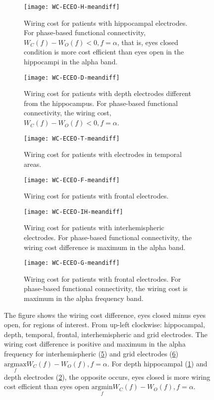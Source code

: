 \documentclass[11pt, onecolumn]{article}
\begin{document}
\begin{figure}[h] 
  \begin{subfigure}[t]{0.5\linewidth}
    \centering
    \texttt{[image: WC-ECEO-H-meandiff]} 
    \caption{Wiring cost for patients with hippocampal electrodes. For phase-based functional connectivity, $W_C(f) - W_O(f) <0, f = \alpha$, that is, eyes closed condition is more cost efficient than eyes open in the hippocampi in the alpha band.} 
    \label{figi-2:a} 
  \end{subfigure}%
  \hspace{1ex}
  \begin{subfigure}[t]{0.5\linewidth}
    \centering
    \texttt{[image: WC-ECEO-D-meandiff]} 
    \caption{Wiring cost for patients with depth electrodes different from the hippocampus. For phase-based functional connectivity, the wiring cost, $W_C(f) - W_O(f) <0, f = \alpha$.} 
    \label{figi-2:b} 
  \end{subfigure} 
  \begin{subfigure}[t]{0.5\linewidth}
    \centering
    \texttt{[image: WC-ECEO-T-meandiff]} 
    \caption{Wiring cost for patients with electrodes in temporal areas.} 
    \label{figi-2:c} 
  \end{subfigure} 
  \hspace{1ex}
 \begin{subfigure}[t]{0.5\linewidth}
    \centering
    \texttt{[image: WC-ECEO-F-meandiff]} 
    \caption{Wiring cost for patients with frontal electrodes. } 
    \label{figi-2:d} 
  \end{subfigure} 
    \begin{subfigure}[t]{0.5\linewidth}
    \centering
    \texttt{[image: WC-ECEO-IH-meandiff]} 
    \caption{Wiring cost for patients with interhemispheric electrodes. For phase-based functional connectivity, the wiring cost difference is maximum in the alpha band.} 
    \label{figi-2:e} 
  \end{subfigure}%
    \hspace{1ex}
   \begin{subfigure}[t]{0.5\linewidth}
    \centering
    \texttt{[image: WC-ECEO-G-meandiff]} 
    \caption{Wiring cost for patients with frontal electrodes. For phase-based functional connectivity, the wiring cost is maximum in the alpha frequency band.} 
    \label{figi-2:f} 
  \end{subfigure} 
  \caption{The figure shows the wiring cost difference, eyes closed minus eyes open, for regions of interest. From up-left clockwise: hippocampal, depth, temporal, frontal, interhemispheric and grid electrodes. The wiring cost difference is positive and maximum in the alpha frequency for interhemispheric (\ref{figi-2:e}) and grid electrodes (\ref{figi-2:f}) $\underset{f}{\mathrm{argmax}} W_C(f) - W_O(f), f =\alpha$. For depth hippocampal (\ref{figi-2:a}) and depth electrodes (\ref{figi-2:b}), the opposite occurs, eyes closed is more wiring cost efficient than eyes open $\underset{f}{\mathrm{argmin}}W_C(f) - W_O(f), f =\alpha$.}
  \label{fig:figi-2} 
\end{figure}
\end{document}
